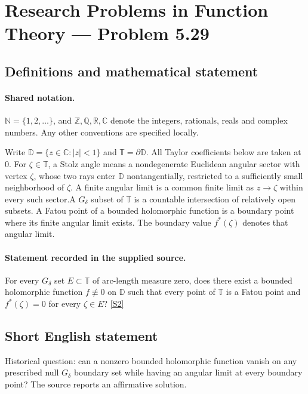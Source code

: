 \documentclass[11pt]{article}
\newcommand{\sref}[2]{\hyperlink{source:#1:#2}{[S#2]}}
\begin{document}
\section{Research Problems in Function Theory — Problem 5.29}\label{statement}

\subsection{Definitions and mathematical statement}

\paragraph{Shared notation.}$\mathbb N=\{1,2,\ldots\}$, and $\mathbb Z,\mathbb Q,\mathbb R,\mathbb C$ denote the integers, rationals, reals and complex numbers. Any other conventions are specified locally.


Write $\mathbb D=\{z\in\mathbb C:|z|<1\}$ and $\mathbb T=\partial\mathbb D$. All Taylor coefficients below are taken at $0$. For $\zeta\in\mathbb T$, a Stolz angle means a nondegenerate Euclidean angular sector with vertex $\zeta$, whose two rays enter $\mathbb D$ nontangentially, restricted to a sufficiently small neighborhood of $\zeta$. A finite angular limit is a common finite limit as $z\to\zeta$ within every such sector.A $G_\delta$ subset of $\mathbb T$ is a countable intersection of relatively open subsets. A Fatou point of a bounded holomorphic function is a boundary point where its finite angular limit exists. The boundary value $f^*(\zeta)$ denotes that angular limit.
\paragraph{Statement recorded in the supplied source.}
For every $G_\delta$ set $E\subset\mathbb T$ of arc-length measure zero, does there exist a bounded holomorphic function $f\not\equiv0$ on $\mathbb D$ such that every point of $\mathbb T$ is a Fatou point and $f^*(\zeta)=0$ for every $\zeta\in E$? \sref{statement}{2}
\subsection{Short English statement}
Historical question: can a nonzero bounded holomorphic function vanish on any prescribed null $G_\delta$ boundary set while having an angular limit at every boundary point? The source reports an affirmative solution.
\end{document}
